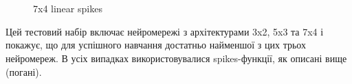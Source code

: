 \documentclass[a4paper,10pt,fleqn]{article}
\begin{document}
\begin{figure}
  \centering
  \,
   \\
  \,
  \caption{7x4 linear spikes}
\end{figure}

\clearpage
\newpage

Цей тестовий набір включає нейромережі з архітектурами 3x2, 5x3 та 7x4 і покажує, що для успішного навчання достатньо найменшої з цих трьох нейромереж.
В усіх випадках використовувалися spikes-функції, як описані вище (погані).
\end{document}
